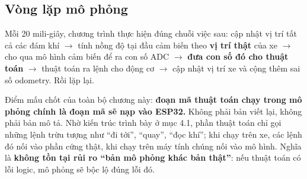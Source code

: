 \subsection{Vòng lặp mô phỏng}
Mỗi 20 mili-giây, chương trình thực hiện đúng chuỗi việc sau: cập nhật vị trí tất cả các đám khí $\rightarrow$ tính nồng độ tại đầu cảm biến theo \textbf{vị trí thật} của xe $\rightarrow$ cho qua mô hình cảm biến để ra con số ADC $\rightarrow$ \textbf{đưa con số đó cho thuật toán} $\rightarrow$ thuật toán ra lệnh cho động cơ $\rightarrow$ cập nhật vị trí xe và cộng thêm sai số odometry. Rồi lặp lại.

Điểm mấu chốt của toàn bộ chương này: \textbf{đoạn mã thuật toán chạy trong mô phỏng chính là đoạn mã sẽ nạp vào ESP32.} Không phải bản viết lại, không phải bản mô tả. Nhờ kiến trúc trình bày ở mục 4.1, phần thuật toán chỉ gọi những lệnh trừu tượng như ``đi tới'', ``quay'', ``đọc khí''; khi chạy trên xe, các lệnh đó nối vào phần cứng thật, khi chạy trên máy tính chúng nối vào mô hình. Nghĩa là \textbf{không tồn tại rủi ro ``bản mô phỏng khác bản thật''}: nếu thuật toán có lỗi logic, mô phỏng sẽ bộc lộ đúng lỗi đó.



